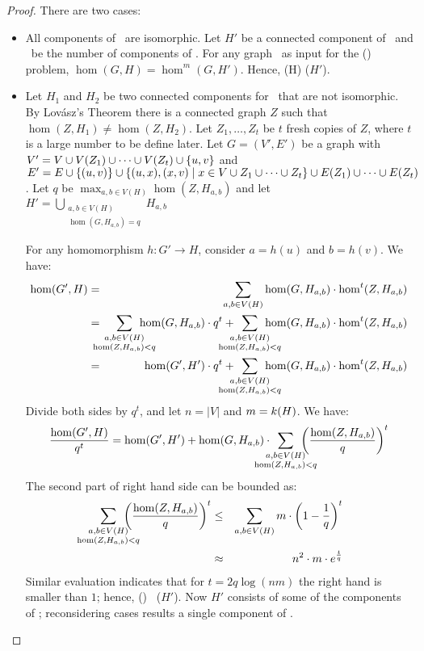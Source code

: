 \begin{proof}
There are two cases:
\begin{itemize}
\item All components of \mH\ are isomorphic. Let \(H'\) be a connected component of \mH\ and
\mm\ be the number of components of \mH\@. For any graph \mG\ as input for the
\chom(\mH) problem, \(\hom(G,H)=\hom^m(G,H')\). Hence, \chom(H) \mapge \chom(\(H'\))\@.
\item Let \(H_1\) and \(H_2\) be two connected components for \mH\ that are not isomorphic.
By Lov\'{a}sz's Theorem there is a connected graph \(Z\) such that \(\hom(Z,H_1) \neq \hom(Z,H_2)\)\@.
Let \(Z_1,\dotsc,Z_t\) be \(t\) fresh copies of \(Z\), where \(t\) is a large number to be 
define later.
Let \(G=(V',E')\) be a graph with \(V'=V \cup V(Z_1)\cup \dotsb \cup V(Z_t) \cup \{{u,v}\} \)
and \(E'=E \cup \{{(u,v)}\} \cup \{{(u,x),(x,v) \mid x \in V \cup  Z_1 \cup \dotsb \cup Z_t}\} \cup
E(Z_1)\cup \dotsb \cup E(Z_t)\)\@. Let \(q\) be \(\max_{a,b \in V(H)} \hom(Z,H_{a,b})\) and
let \(H'=\bigcup_{\substack{a,b\in V(H) \\ 
\hom(G,H_{a,b})=q}} H_{a,b}\)


For any homomorphism \(h: G'\to H\), consider \(a=h(u)\)  and \(b=h(v)\). We have:
\begin{eqnarray*}
\hom(G',H) &=&
\sum_{a,b\in V(H)} \hom(G,H_{a,b}) \cdot \hom^t(Z, H_{a,b}) \\
&=&
\bigsum{\substack{a,b\in V(H)\\ \hom(Z, H_{a,b}) < q}} \hom(G, H_{a,b}) \cdot q^t + 
\bigsum{\substack{a,b\in V(H)\\ \hom(Z, H_{a,b}) < q}} 
\hom(G, H_{a,b}) \cdot \hom^t(Z,H_{a,b})\\
&=&
\hom(G',H') \cdot q^t + \bigsum{\substack{a,b\in V(H)\\ \hom(Z, H_{a,b}) < q}} 
\hom(G, H_{a,b}) \cdot \hom^t(Z,H_{a,b})
\end{eqnarray*}
Divide both sides by \(q^t\), and let \(n=|V|\) and \(m=k(H)\)\@. We have:
\[
\frac{\hom(G',H)}{q^t} = 
\hom(G',H') + \hom(G, H_{a,b}) \cdot 
\bigsum{\substack{a,b\in V(H)\\ \hom(Z, H_{a,b}) < q}} 
\left(\frac{\hom(Z,H_{a,b})}{q}\right)^t 
\]
The second part of right hand side can be bounded as:
\begin{eqnarray*}
\bigsum{\substack{a,b\in V(H)\\ \hom(Z, H_{a,b}) < q}} 
\left(\frac{\hom(Z,H_{a,b})}{q}\right)^t  &\le &
\sum_{a,b\in V(H)} m\cdot \left(1-\frac{1}{q}\right)^t \\
&\approx & n^2 \cdot m \cdot e^{\frac{t}{q}} \\
\end{eqnarray*}
Similar evaluation indicates that
for \(t=2q\log(nm)\) the right hand is smaller than \(1\); hence, \chom(\mH) \mapge\ \chom(\(H'\)). 
Now \(H'\) consists of some of the components of \mH; reconsidering cases results a single component
of \mH\@.
\end{itemize}
\end{proof}

